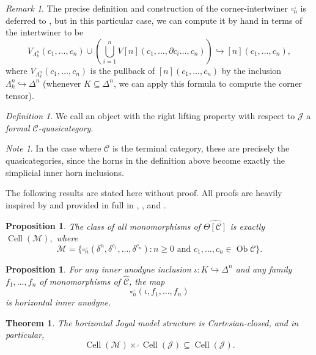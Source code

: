\documentclass[leqno]{article}
\numberwithin{equation}{subsection}
\theoremstyle{plain}   %
\newtheorem{thm}[equation]{Theorem}
\newtheorem{prop}[equation]{Proposition}
\theoremstyle{remark}
\newtheorem{rem}[equation]{Remark}
\newtheorem{note}[equation]{Note}
\newtheorem{defn}[equation]{Definition}
\theoremstyle{plain}
\DeclareMathOperator{\Ob}{Ob}
\newcommand{\psh}[1]{\ensuremath{\widehat{#1}}}
\providecommand{\C}{}
\renewcommand{\C}{\ensuremath{\mathcal{C}}}
\newcommand{\cellset}{\ensuremath{\widehat{\Theta[\mathcal{C}]}}}
\begin{document}
\begin{rem}
	The precise definition and construction of the corner-intertwiner \(\square^\lrcorner_n\) is deferred to , but in this particular case, we can compute it by hand in terms of the intertwiner to be \[V_{\Lambda^n_k}(c_1,\dots,c_n) \cup \left(\bigcup_{i=1}^n V[n](c_1,\dots,\partial c_i \dots, c_n) \right) \hookrightarrow [n](c_1,\dots,c_n),\] where \(V_{\Lambda^n_k}(c_1,\dots,c_n)\) is the pullback of \([n](c_1,\dots,c_n)\) by the inclusion \(\Lambda^n_k\hookrightarrow \Delta^n\) (whenever \(K\subseteq \Delta^n\), we can apply this formula to compute the corner tensor).
\end{rem}

\begin{defn}
	We call an object with the right lifting property with respect to \(\mathscr{J}\) a \emph{formal \(\C\)-quasicategory}.
\end{defn}

\begin{note} 
	In the case where \(\C\) is the terminal category, these are precisely the quasicategories, since the horns in the definition above become exactly the simplicial inner horn inclusions.
\end{note}

The following results are stated here without proof.  All proofs are heavily inspired by \cite{oury} and provided in full in , , and .

\begin{prop}
	The class of all monomorphisms of \(\cellset\) is exactly \(\operatorname{Cell}(\mathscr{M}),\) where \[\mathscr{M}=\{\square_n^\lrcorner(\delta^n,\delta^{c_1},\dots,\delta^{c_n}) : n\geq 0 \text{ and } c_1,\dots,c_n \in \Ob \C\}.\]
\end{prop}

\begin{prop}
	For any inner anodyne inclusion \(\iota:K\hookrightarrow \Delta^n\) and any family \(f_1,\dots,f_n\) of monomorphisms of \(\psh{\C}\), the map \[\square^\lrcorner_n(\iota,f_1,\dots,f_n)\] is horizontal inner anodyne.
\end{prop}

\begin{thm} The horizontal Joyal model structure is Cartesian-closed, and in particular, \[\operatorname{Cell}(\mathscr{M})\times^\lrcorner \operatorname{Cell}(\mathscr{J}) \subseteq \operatorname{Cell}(\mathscr{J}).\]
\end{thm}
\end{document}
